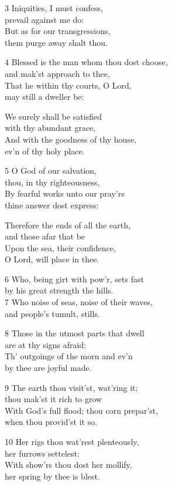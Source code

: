 3 Iniquities, I must confess,\\
prevail against me do:\\
But as for our transgressions,\\
them purge away shalt thou.

4 Blessed is the man whom thou dost choose,\\
and mak’st approach to thee,\\
That he within thy courts, O Lord,\\
may still a dweller be:

We surely shall be satisfied\\
with thy abundant grace,\\
And with the goodness of thy house,\\
ev’n of thy holy place.

5 O God of our salvation,\\
thou, in thy righteousness,\\
By fearful works unto our pray’rs\\
thine answer dost express:

Therefore the ends of all the earth,\\
and those afar that be\\
Upon the sea, their confidence,\\
O Lord, will place in thee.

6 Who, being girt with pow’r, sets fast\\
by his great strength the hills.\\
7 Who noise of seas, noise of their waves,\\
and people’s tumult, stills.

8 Those in the utmost parts that dwell\\
are at thy signs afraid:\\
Th’ outgoings of the morn and ev’n\\
by thee are joyful made.

9 The earth thou visit’st, wat’ring it;\\
thou mak’st it rich to grow\\
With God’s full flood; thou corn prepar’st,\\
when thou provid’st it so.

10 Her rigs thou wat’rest plenteously,\\
her furrows settelest:\\
With show’rs thou dost her mollify,\\
her spring by thee is blest.

